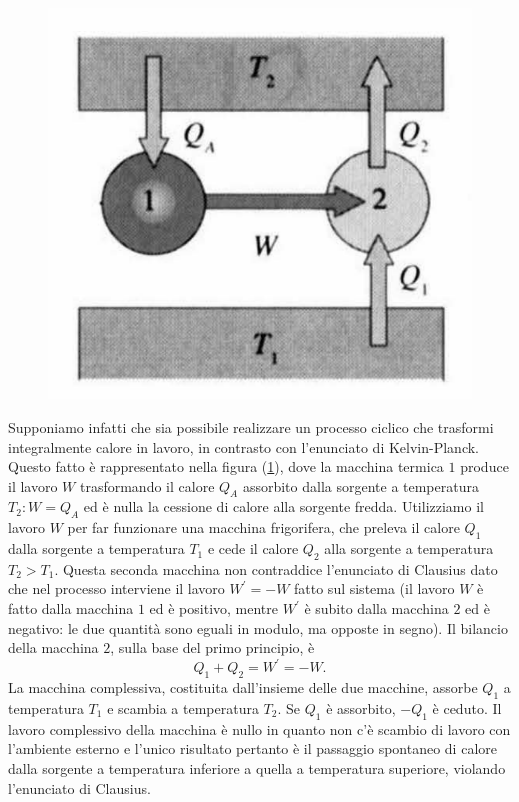 \documentclass[class=book, crop=false, oneside, 12pt]{standalone}
\begin{document}
\begin{figure}[h] 
    \includegraphics[scale=0.4]{not_kelvin.png}
    \centering
    \caption{}
    \label{not_kelvin}
\end{figure}
Supponiamo infatti che sia possibile realizzare un processo ciclico che trasformi integralmente calore in lavoro, in contrasto con l'enunciato di Kelvin-Planck. 
Questo fatto è rappresentato nella figura (\ref{not_kelvin}), dove la macchina termica \(1\) produce il lavoro \(W\) trasformando il calore \(Q_A\) assorbito dalla sorgente a temperatura \(T_2 : W = Q_A\) ed è nulla la cessione di calore alla sorgente fredda. 
Utilizziamo il lavoro \(W\) per far funzionare una macchina frigorifera, che preleva il calore \(Q_1\) dalla sorgente a temperatura \(T_1\) e cede il calore \(Q_2\) alla sorgente a temperatura \(T_2>T_1\). 
Questa seconda macchina non contraddice l'enunciato di Clausius dato che nel processo interviene il lavoro \(W^{\prime} = -W\) fatto sul sistema (il lavoro \(W\) è fatto dalla macchina \(1\) ed è positivo, mentre \(W^{\prime}\) è subito dalla macchina \(2\) ed è negativo: 
le due quantità sono eguali in modulo, ma opposte in segno). 
Il bilancio della macchina \(2\), sulla base del primo principio, è 
\begin{equation*}
    Q_1 + Q_2 = W^{\prime} = - W.
\end{equation*}
La macchina complessiva, costituita dall'insieme delle due macchine, assorbe \(Q_1\) a temperatura \(T_1\) e scambia a temperatura \(T_2\). 
Se \(Q_1\) è assorbito, \(-Q_1\) è ceduto. 
Il lavoro complessivo della macchina è nullo in quanto non c'è scambio di lavoro con l'ambiente esterno e l'unico risultato pertanto è il passaggio spontaneo di calore dalla sorgente a temperatura inferiore a quella a temperatura superiore, violando l'enunciato di Clausius.
\end{document}
